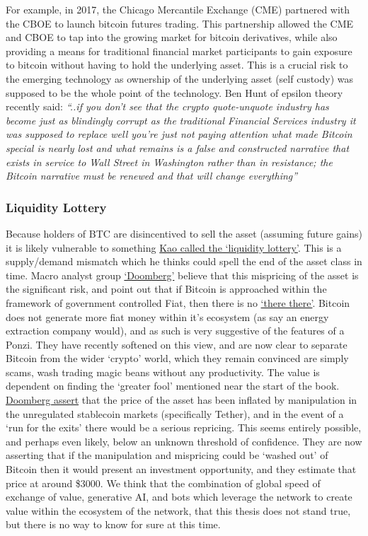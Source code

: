 \begin{itemize}
For example, in 2017, the Chicago Mercantile Exchange (CME) partnered with the CBOE to launch bitcoin futures trading. This partnership allowed the CME and CBOE to tap into the growing market for bitcoin derivatives, while also providing a means for traditional financial market participants to gain exposure to bitcoin without having to hold the underlying asset. This is a crucial risk to the emerging technology as ownership of the underlying asset (self custody) was supposed to be the whole point of the technology. Ben Hunt of epsilon theory recently said: \textit{``..if you don't see that the crypto quote-unquote industry has become just as blindingly corrupt as the traditional Financial Services industry it was supposed to replace well you're just not paying attention what made Bitcoin special is nearly lost and what remains is a false and constructed narrative that exists in service to Wall Street in Washington rather than in resistance; the Bitcoin narrative must be renewed and that will change everything''}
\subsubsection{Liquidity Lottery}
Because holders of BTC are disincentived to sell the asset (assuming future gains) it is likely vulnerable to something \href{https://twitter.com/UrbanKaoboy/status/1526311908709502977}{Kao called the `liquidity lottery'}. This is a supply/demand mismatch which he thinks could spell the end of the asset class in time. Macro analyst group \href{https://doomberg.substack.com/}{`Doomberg'} believe that this mispricing of the asset is the significant risk, and point out that if Bitcoin is approached within the framework of government controlled Fiat, then there is no \href{https://en.wiktionary.org/wiki/there_is_no_there_there}{`there there'}. Bitcoin does not generate more fiat money within it's ecosystem (as say an energy extraction company would), and as such is very suggestive of the features of a Ponzi. They have recently softened on this view, and are now clear to separate Bitcoin from the wider `crypto' world, which they remain convinced are simply scams, wash trading magic beans without any productivity. The value is dependent on finding the `greater fool' mentioned near the start of the book. \href{https://doomberg.substack.com/p/dollars-ex-machina}{Doomberg assert} that the price of the asset has been inflated by manipulation in the unregulated stablecoin markets (specifically Tether), and in the event of a `run for the exits' there would be a serious repricing. This seems entirely possible, and perhaps even likely, below an unknown threshold of confidence. They are now asserting that if the manipulation and mispricing could be `washed out' of Bitcoin then it would present an investment opportunity, and they estimate that price at around \$3000. We think that the combination of global speed of exchange of value, generative AI, and bots which leverage the network to create value within the ecosystem of the network, that this thesis does not stand true, but there is no way to know for sure at this time.

\end{itemize}

